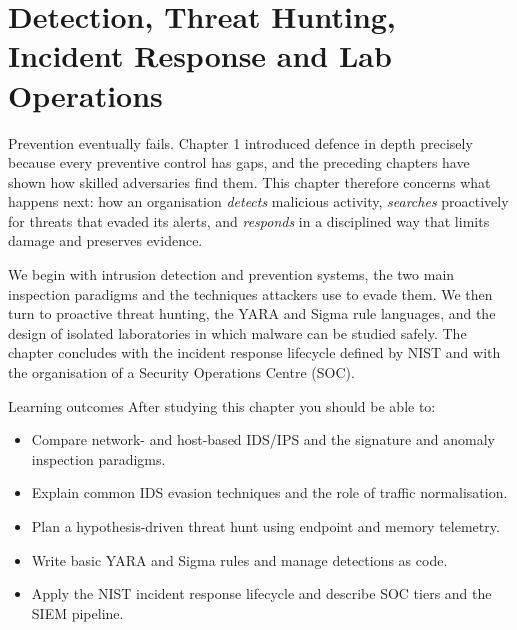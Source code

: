 \chapter{Detection, Threat Hunting, Incident Response and Lab Operations}\label{ch:11}

Prevention eventually fails. Chapter 1 introduced defence in depth precisely because every preventive control has gaps, and the preceding chapters have shown how skilled adversaries find them. This chapter therefore concerns what happens next: how an organisation \emph{detects} malicious activity, \emph{searches} proactively for threats that evaded its alerts, and \emph{responds} in a disciplined way that limits damage and preserves evidence.

We begin with intrusion detection and prevention systems, the two main inspection paradigms and the techniques attackers use to evade them. We then turn to proactive threat hunting, the YARA and Sigma rule languages, and the design of isolated laboratories in which malware can be studied safely. The chapter concludes with the incident response lifecycle defined by NIST and with the organisation of a Security Operations Centre (SOC).

\begin{outcomesbox}{Learning outcomes}
After studying this chapter you should be able to:
\begin{itemize}
  \item Compare network- and host-based IDS/IPS and the signature and anomaly inspection paradigms.
  \item Explain common IDS evasion techniques and the role of traffic normalisation.
  \item Plan a hypothesis-driven threat hunt using endpoint and memory telemetry.
  \item Write basic YARA and Sigma rules and manage detections as code.
  \item Apply the NIST incident response lifecycle and describe SOC tiers and the SIEM pipeline.
\end{itemize}
\end{outcomesbox}

